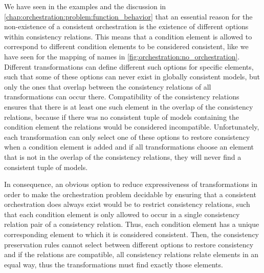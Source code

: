 We have seen in the examples and the discussion in \autoref{chap:orchestration:problem:function_behavior} that an essential reason for the non-existence of a consistent orchestration is the existence of different options within consistency relations.
This means that a condition element is allowed to correspond to different condition elements to be considered consistent, like we have seen for the mapping of names in \autoref{fig:orchestration:no_orchestration}.
Different transformations can define different such options for specific elements, such that some of these options can never exist in globally consistent models, but only the ones that overlap between the consistency relations of all transformations can occur there.
Compatibility of the consistency relations ensures that there is at least one such element in the overlap of the consistency relations, because if there was no consistent tuple of models containing the condition element the relations would be considered incompatible.
Unfortunately, each transformation can only select one of these options to restore consistency when a condition element is added and if all transformations choose an element that is not in the overlap of the consistency relations, they will never find a consistent tuple of models.

In consequence, an obvious option to reduce expressiveness of transformations in order to make the orchestration problem decidable by ensuring that a consistent orchestration does always exist would be to restrict consistency relations, such that each condition element is only allowed to occur in a single consistency relation pair of a consistency relation.
Thus, each condition element has a unique corresponding element to which it is considered consistent.
Then, the consistency preservation rules cannot select between different options to restore consistency and if the relations are compatible, all consistency relations relate elements in an equal way, thus the transformations must find exactly those elements.

